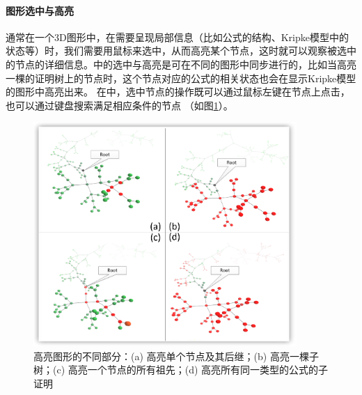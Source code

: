 \paragraph{图形选中与高亮}
通常在一个3D图形中，在需要呈现局部信息（比如公式的结构、Kripke模型中的状态等）时，我们需要用鼠标来选中，从而高亮某个节点，这时就可以观察被选中的节点的详细信息。中的选中与高亮是可在不同的图形中同步进行的，比如当高亮一棵\sctlprov{}的证明树上的节点时，这个节点对应的公式的相关状态也会在显示Kripke模型的图形中高亮出来。 在中，选中节点的操作既可以通过鼠标左键在节点上点击，也可以通过键盘搜索满足相应条件的节点 （如图\ref{vmdv:prooftree:high:different}）。
\begin{figure}[h!]
	\centering
	\caption{高亮图形的不同部分：(a) 高亮单个节点及其后继；(b) 高亮一棵子树；(c) 高亮一个节点的所有祖先；(d) 高亮所有同一类型的公式的子证明}
	\label{vmdv:prooftree:high:different}
	\includegraphics[width=10cm]{Img/high_different.png}
	
\end{figure}
